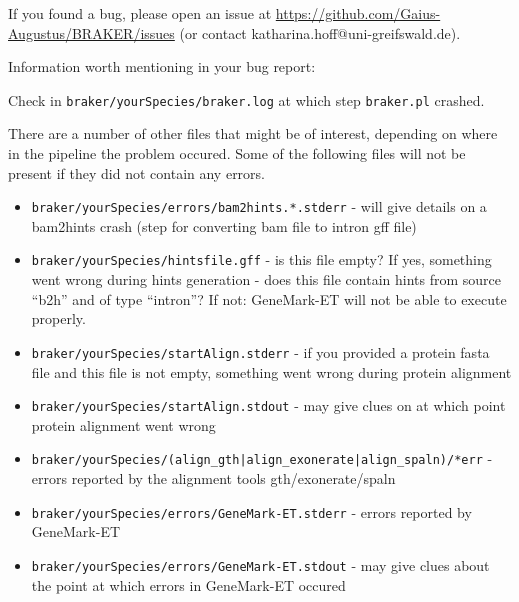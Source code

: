\documentclass[a4paper,10pt]{report}
\begin{document}
If you found a bug, please open an issue at \url{https://github.com/Gaius-Augustus/BRAKER/issues} (or contact katharina.hoff@uni-greifswald.de).

Information worth mentioning in your bug report:

Check in \texttt{braker/yourSpecies/braker.log} at which step \texttt{braker.pl} crashed.

There are a number of other files that might be of interest, depending on where in the pipeline the
problem occured. Some of the following files will not be present if they did not contain any errors.

\begin{itemize}
 \item  \texttt{braker/yourSpecies/errors/bam2hints.*.stderr} - will give details on a bam2hints crash (step for 
                                                  converting bam file to intron gff file)
 
 \item  \texttt{braker/yourSpecies/hintsfile.gff} - is this file empty? If yes, something went wrong during hints 
                                      generation
                                    - does this file contain hints from source ``b2h'' and of type 
                                      ``intron''? If not: GeneMark-ET will not be able to execute 
                                      properly.
 
 \item  \texttt{braker/yourSpecies/startAlign.stderr} - if you provided a protein fasta file and this file is not
                                          empty, something went wrong during protein alignment
\item    \texttt{braker/yourSpecies/startAlign.stdout} - may give clues on at which point protein alignment went
                                          wrong

 \item  \texttt{braker/yourSpecies/(align\_gth|align\_exonerate|align\_spaln)/*err} - errors reported by the 
																																		 alignment tools 
                                                                     gth/exonerate/spaln

 \item  \texttt{braker/yourSpecies/errors/GeneMark-ET.stderr} - errors reported by GeneMark-ET
 \item  \texttt{braker/yourSpecies/errors/GeneMark-ET.stdout} - may give clues about the point at which errors in
                                                  GeneMark-ET occured


\end{itemize}
\end{document}
